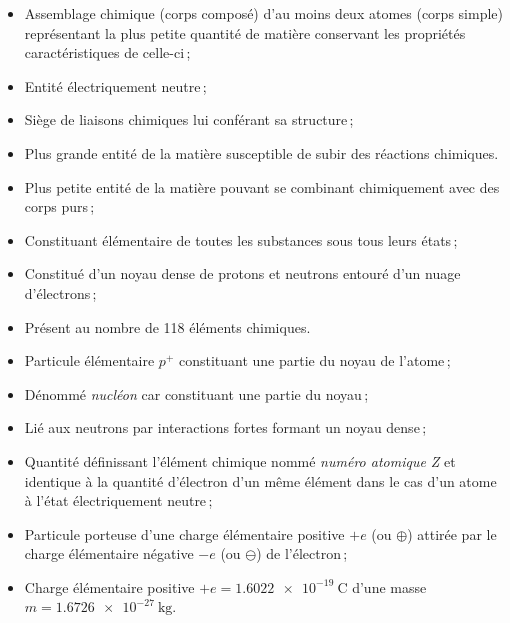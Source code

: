 \begin{definition}[Molécule]
		\begin{itemize}
			\item Assemblage chimique (corps composé) d'au moins deux atomes (corps simple) représentant la plus petite quantité de matière conservant les propriétés caractéristiques de celle-ci\,;
			\item Entité électriquement neutre\,;
			\item Siège de liaisons chimiques lui conférant sa structure\,;
			\item Plus grande entité de la matière susceptible de subir des réactions chimiques. 
		\end{itemize}
\end{definition}

\begin{definition}[Atome]
		\begin{itemize}
			\item Plus petite entité de la matière pouvant se combinant chimiquement avec des corps purs\,;
			\item Constituant élémentaire de toutes les substances sous tous leurs états\,;
			\item Constitué d'un noyau dense de protons et neutrons entouré d'un nuage d'électrons\,;
			\item Présent au nombre de 118 éléments chimiques.
		\end{itemize}
\end{definition}

\begin{definition}[Proton]
		\begin{itemize}
			\item Particule élémentaire $p^+$ constituant une partie du noyau de l'atome\,;
			\item Dénommé \emph{nucléon} car constituant une partie du noyau\,;
			\item Lié aux neutrons par interactions fortes formant un noyau dense\,;
			\item Quantité définissant l'élément chimique nommé \emph{numéro atomique Z} et identique à la quantité d'électron d'un même élément dans le cas d'un atome à l'état électriquement neutre\,; 
			\item Particule porteuse d'une charge élémentaire positive $+e$ (ou $\oplus$) attirée par le charge élémentaire négative $-e$ (ou $\ominus$) de l'électron\,;
			\item Charge élémentaire positive $+e=\SI{1,6022e-19}{\coulomb}$ d'une masse $m=\SI{1,6726e-27}{\kilogram}$.
		\end{itemize}
\end{definition}

